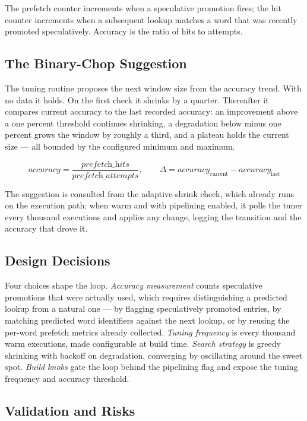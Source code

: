 The prefetch counter increments when a speculative promotion fires; the hit
counter increments when a subsequent lookup matches a word that was recently
promoted speculatively. Accuracy is the ratio of hits to attempts.

\subsection{The Binary-Chop Suggestion}

The tuning routine proposes the next window size from the accuracy trend. With no
data it holds. On the first check it shrinks by a quarter. Thereafter it compares
current accuracy to the last recorded accuracy: an improvement above a one
percent threshold continues shrinking, a degradation below minus one percent
grows the window by roughly a third, and a plateau holds the current size --- all
bounded by the configured minimum and maximum.

\begin{equation}
\textit{accuracy} = \frac{\textit{prefetch\_hits}}{\textit{prefetch\_attempts}},
\qquad
\Delta = \textit{accuracy}_{\text{current}} - \textit{accuracy}_{\text{last}}
\end{equation}

The suggestion is consulted from the adaptive-shrink check, which already runs on
the execution path; when warm and with pipelining enabled, it polls the tuner
every thousand executions and applies any change, logging the transition and the
accuracy that drove it.

\subsection{Design Decisions}

Four choices shape the loop. \emph{Accuracy measurement} counts speculative
promotions that were actually used, which requires distinguishing a predicted
lookup from a natural one --- by flagging speculatively promoted entries, by
matching predicted word identifiers against the next lookup, or by reusing the
per-word prefetch metrics already collected. \emph{Tuning frequency} is every
thousand warm executions, made configurable at build time. \emph{Search strategy}
is greedy shrinking with backoff on degradation, converging by oscillating around
the sweet spot. \emph{Build knobs} gate the loop behind the pipelining flag and
expose the tuning frequency and accuracy threshold.

\subsection{Validation and Risks}

